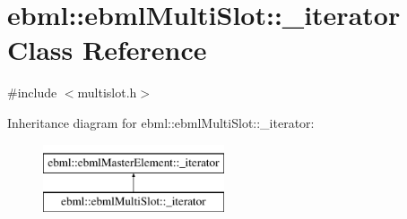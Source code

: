 \hypertarget{classebml_1_1ebmlMultiSlot_1_1__iterator}{}\section{ebml\+:\+:ebml\+Multi\+Slot\+:\+:\+\_\+iterator Class Reference}
\label{classebml_1_1ebmlMultiSlot_1_1__iterator}


{\ttfamily \#include $<$multislot.\+h$>$}

Inheritance diagram for ebml\+:\+:ebml\+Multi\+Slot\+:\+:\+\_\+iterator\+:\begin{figure}[H]
\begin{center}
\leavevmode
\includegraphics[height=2.000000cm]{classebml_1_1ebmlMultiSlot_1_1__iterator}
\end{center}
\end{figure}
